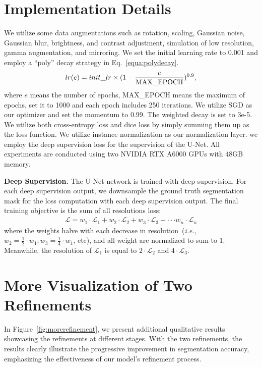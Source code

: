 \section{Implementation Details}
We utilize some data augmentations such as rotation, scaling, Gaussian noise, Gaussian blur, brightness, and contrast adjustment, simulation of low resolution, gamma augmentation, and mirroring. We set the initial learning rate to 0.001 and employ a ``poly'' decay strategy in Eq.~\eqref{equa:polydecay}.
\begin{equation}
    lr(e)= init\_lr \times (1 - \frac{e}{\rm MAX\_EPOCH})^{0.9},
\label{equa:polydecay}
\end{equation}
where $e$ means the number of epochs, MAX\_EPOCH means the maximum of epochs, set it to 1000 and each epoch includes 250 iterations. We utilize SGD as our optimizer and set the momentum to 0.99. The weighted decay is set to 3e-5. We utilize both cross-entropy loss and dice loss by simply summing them up as the loss function. We utilize instance normalization as our normalization layer. we employ the deep supervision loss for the supervision of the U-Net. All experiments are conducted using two NVIDIA RTX A6000 GPUs with 48GB memory.

\noindent\textbf{Deep Supervision.} The U-Net network is trained with deep supervision. 
For each deep supervision output, we downsample the ground truth segmentation mask for the loss computation with each deep supervision output. The final training objective is the sum of all resolutions loss:
\begin{equation}
    \begin{aligned}
            \mathcal{L} = w_1 \cdot \mathcal{L}_1 + w_2 \cdot \mathcal{L}_2 + w_3 \cdot \mathcal{L}_3 + \cdot \cdot \cdot w_n \cdot \mathcal{L}_n
    \end{aligned}
    \label{equa:finalloss}
\end{equation}
where the weights halve with each decrease in resolution~(\textit{i.e.,} $w_2 = \frac{1}{2} \cdot w_1; w_3 = \frac{1}{4} \cdot w_1$, etc), and all weight are normalized to sum to 1. Meanwhile, the resolution of $\mathcal{L}_1$ is equal to $2 \cdot \mathcal{L}_2$ and $4 \cdot \mathcal{L}_3$.

\section{More Visualization of Two Refinements}
In Figure~\ref{fig:morerefinement}, we present additional qualitative results showcasing the refinements at different stages. With the two refinements, the results clearly illustrate the progressive improvement in segmentation accuracy, emphasizing the effectiveness of our model's refinement process.

